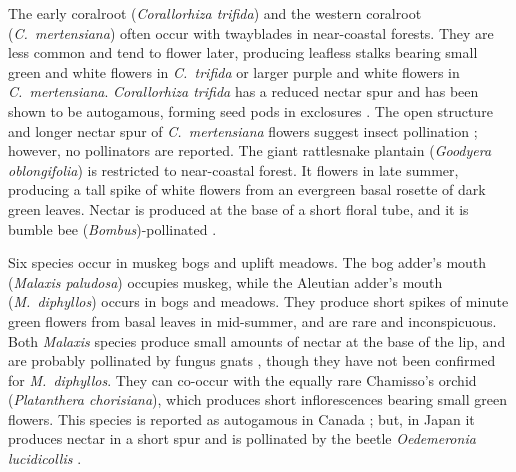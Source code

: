 \begin{multicols}{2}
The early coralroot (\emph{Corallorhiza trifida}) and the western
coralroot (\emph{C.\ mertensiana}) often occur with twayblades in
near-coastal forests. They are less common and tend to flower later,
producing leafless stalks bearing small green and white flowers in
\emph{C.\ trifida} or larger purple and white flowers in \emph{C.\
mertensiana}. \emph{Corallorhiza trifida} has a reduced nectar spur and
has been shown to be autogamous, forming seed pods in exclosures
\citep{Catling1983}. The open structure and longer nectar spur of \emph{C.\
mertensiana} flowers suggest insect pollination \citep{Freudenstein1997};
however, no pollinators are reported. The giant rattlesnake plantain
(\emph{Goodyera oblongifolia}) is restricted to near-coastal forest. It
flowers in late summer, producing a tall spike of white flowers from an
evergreen basal rosette of dark green leaves. Nectar is produced at the
base of a short floral tube, and it is bumble bee
(\emph{Bombus})-pollinated \citep{Ackerman1975}.



Six species occur in muskeg bogs and uplift meadows. The bog adder's
mouth (\emph{Malaxis paludosa}) occupies muskeg, while the Aleutian
adder's mouth (\emph{M.\ diphyllos}) occurs in bogs and meadows. They
produce short spikes of minute green flowers from basal leaves in
mid-summer, and are rare and inconspicuous. Both \emph{Malaxis} species
produce small amounts of nectar at the base of the lip, and are probably
pollinated by fungus gnats \citep[][]{ReevesReeves1984}, though they
have not been confirmed for \emph{M.\ diphyllos}. They can co-occur with
the equally rare Chamisso's orchid (\emph{Platanthera chorisiana}),
which produces short inflorescences bearing small green flowers. This
species is reported as autogamous in Canada \citep{Catling1984}; but, in
Japan it produces nectar in a short spur and is pollinated by the beetle
\emph{Oedemeronia lucidicollis} \citep{Inoue1981}.



\end{multicols}
